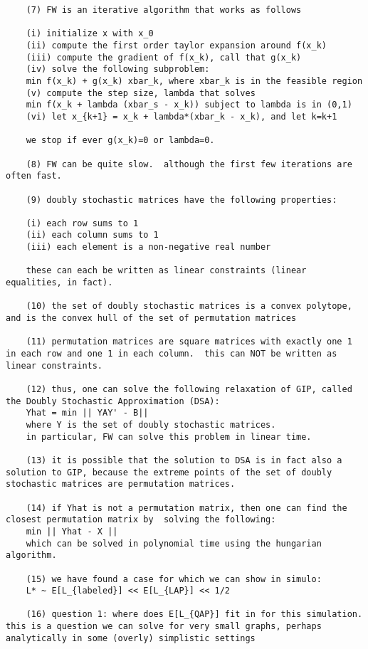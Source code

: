 \begin{verbatim}
	(7) FW is an iterative algorithm that works as follows

	(i) initialize x with x_0
	(ii) compute the first order taylor expansion around f(x_k)
	(iii) compute the gradient of f(x_k), call that g(x_k)
	(iv) solve the following subproblem:
	min f(x_k) + g(x_k) xbar_k, where xbar_k is in the feasible region
	(v) compute the step size, lambda that solves
	min f(x_k + lambda (xbar_s - x_k)) subject to lambda is in (0,1)
	(vi) let x_{k+1} = x_k + lambda*(xbar_k - x_k), and let k=k+1

	we stop if ever g(x_k)=0 or lambda=0.

	(8) FW can be quite slow.  although the first few iterations are often fast.

	(9) doubly stochastic matrices have the following properties:

	(i) each row sums to 1
	(ii) each column sums to 1
	(iii) each element is a non-negative real number

	these can each be written as linear constraints (linear equalities, in fact).

	(10) the set of doubly stochastic matrices is a convex polytope, and is the convex hull of the set of permutation matrices

	(11) permutation matrices are square matrices with exactly one 1 in each row and one 1 in each column.  this can NOT be written as linear constraints.

	(12) thus, one can solve the following relaxation of GIP, called the Doubly Stochastic Approximation (DSA): 
	Yhat = min || YAY' - B||
	where Y is the set of doubly stochastic matrices.
	in particular, FW can solve this problem in linear time.

	(13) it is possible that the solution to DSA is in fact also a solution to GIP, because the extreme points of the set of doubly stochastic matrices are permutation matrices.

	(14) if Yhat is not a permutation matrix, then one can find the closest permutation matrix by  solving the following:
	min || Yhat - X ||
	which can be solved in polynomial time using the hungarian algorithm.  

	(15) we have found a case for which we can show in simulo:
	L* ~ E[L_{labeled}] << E[L_{LAP}] << 1/2

	(16) question 1: where does E[L_{QAP}] fit in for this simulation.  this is a question we can solve for very small graphs, perhaps analytically in some (overly) simplistic settings


\end{verbatim}
